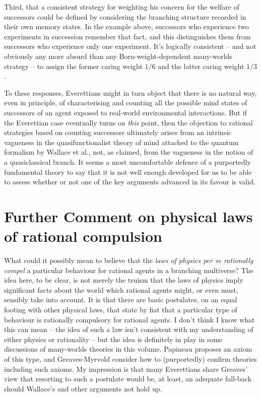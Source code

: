 \documentclass[aps,
pra,epsfig,12pt]{revtex4}
\begin{document}
Third, that a consistent strategy for weighting his concern for the 
welfare of successors could be defined by considering the branching 
structure recorded in their own memory states.   In the example
above, successors who
experience two experiments in succession remember that fact, and 
this distinguishes them from successors who experience only one
experiment.  It's logically consistent -- and not obviously any
more absurd than any Born-weight-dependent many-worlds strategy -- to assign
the former caring weight $1/6$ and the latter caring weight $1/3$. 

To these responses, Everettians might in turn object
that there is no natural way,
even in principle, of characterising and counting all the possible
mind states of successors of an agent exposed to real-world
environmental interactions.  But if the Everettian case eventually
turns on {\it this} point, then 
the objection to rational strategies based on counting successors
ultimately arises from an intrinsic vagueness in the quasifunctionalist 
theory of mind attached to the quantum formalism by Wallace et al.,
not, as claimed, from the vagueness in the notion of a quasiclassical
branch.  It seems a most uncomfortable defence of a
purportedly fundamental theory to say that it is not well enough developed
for us to be able to assess whether or not one of the key arguments
advanced in its favour is valid.  

\section{Further Comment on physical laws of rational 
compulsion}\label{rationalconstraint}

What could it possibly mean to 
believe that the {\it laws of physics per se rationally compel} 
a particular behaviour for rational agents in a branching multiverse?   
The idea here, to be clear, is not merely the truism that the laws of physics 
imply significant facts about the world
which rational agents might, or even must, sensibly take into account. 
It is that there are basic postulates, on an equal footing
with other physical laws, that state by fiat that a particular type of
behaviour is rationally compulsory for rational agents.   
I don't think I know what this can mean -- 
the idea of such a law isn't consistent with my understanding of 
either physics or rationality -- but the 
idea is definitely in play in 
some discussions of many-worlds theories in this volume.  
Papineau \cite{papineauvol} 
proposes an axiom of this type, and Greaves-Myrvold \cite{greavesmyrvoldvol}
consider how to (purportedly) confirm theories including such 
axioms.   My impression is that many
Everettians share Greaves' view \cite{greaves} that resorting to such a 
postulate would be, at least, an adequate fall-back 
should Wallace's \cite{wallacevoltwo} and other
arguments not hold up.   
\end{document}

